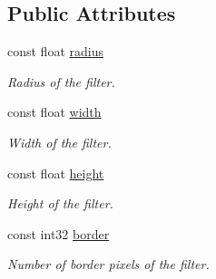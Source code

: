 \subsection*{Public Attributes}
\begin{DoxyCompactItemize}
\item 
\hypertarget{classembree_1_1_filter_a1c8f51881c3ffe113aa4433bb0e33c3a}{
const float \hyperlink{classembree_1_1_filter_a1c8f51881c3ffe113aa4433bb0e33c3a}{radius}}
\label{classembree_1_1_filter_a1c8f51881c3ffe113aa4433bb0e33c3a}

\begin{DoxyCompactList}\small\item\em Radius of the filter. \item\end{DoxyCompactList}\item 
\hypertarget{classembree_1_1_filter_a82efb36dcfd8c1b88b924b73750126e7}{
const float \hyperlink{classembree_1_1_filter_a82efb36dcfd8c1b88b924b73750126e7}{width}}
\label{classembree_1_1_filter_a82efb36dcfd8c1b88b924b73750126e7}

\begin{DoxyCompactList}\small\item\em Width of the filter. \item\end{DoxyCompactList}\item 
\hypertarget{classembree_1_1_filter_a3e7d76c1870c7a37ff9cbad3b6eeff61}{
const float \hyperlink{classembree_1_1_filter_a3e7d76c1870c7a37ff9cbad3b6eeff61}{height}}
\label{classembree_1_1_filter_a3e7d76c1870c7a37ff9cbad3b6eeff61}

\begin{DoxyCompactList}\small\item\em Height of the filter. \item\end{DoxyCompactList}\item 
\hypertarget{classembree_1_1_filter_ab2f83d581309ffb8807c891326291712}{
const int32 \hyperlink{classembree_1_1_filter_ab2f83d581309ffb8807c891326291712}{border}}
\label{classembree_1_1_filter_ab2f83d581309ffb8807c891326291712}

\begin{DoxyCompactList}\small\item\em Number of border pixels of the filter. \item\end{DoxyCompactList}\end{DoxyCompactItemize}


